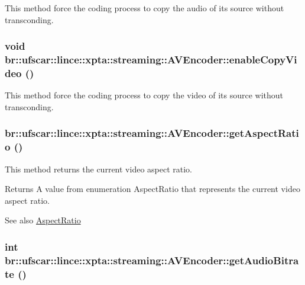 This method force the coding process to copy the audio of its source without transconding. 

\hypertarget{classbr_1_1ufscar_1_1lince_1_1xpta_1_1streaming_1_1AVEncoder_af0ad1de4c1aee3cef2f1700fb69ccfcf}{
\subsubsection[{enableCopyVideo}]{\setlength{\rightskip}{0pt plus 5cm}void br::ufscar::lince::xpta::streaming::AVEncoder::enableCopyVideo ()}}
\label{classbr_1_1ufscar_1_1lince_1_1xpta_1_1streaming_1_1AVEncoder_af0ad1de4c1aee3cef2f1700fb69ccfcf}


This method force the coding process to copy the video of its source without transconding. 

\hypertarget{classbr_1_1ufscar_1_1lince_1_1xpta_1_1streaming_1_1AVEncoder_a6cf4a940089410c06c126a13e57fe157}{
\subsubsection[{getAspectRatio}]{ br::ufscar::lince::xpta::streaming::AVEncoder::getAspectRatio ()}}
\label{classbr_1_1ufscar_1_1lince_1_1xpta_1_1streaming_1_1AVEncoder_a6cf4a940089410c06c126a13e57fe157}


This method returns the current video aspect ratio. 

\begin{DoxyReturn}{Returns}
A value from enumeration AspectRatio that represents the current video aspect ratio. 
\end{DoxyReturn}
\begin{DoxySeeAlso}{See also}
\hyperlink{namespacebr_1_1ufscar_1_1lince_1_1xpta_1_1streaming_a252e3034c41c058052743c39f2e66103}{AspectRatio} 
\end{DoxySeeAlso}
\hypertarget{classbr_1_1ufscar_1_1lince_1_1xpta_1_1streaming_1_1AVEncoder_a532d23d26f7f20dbb67f00131cbdafe9}{
\subsubsection[{getAudioBitrate}]{\setlength{\rightskip}{0pt plus 5cm}int br::ufscar::lince::xpta::streaming::AVEncoder::getAudioBitrate ()}}
\label{classbr_1_1ufscar_1_1lince_1_1xpta_1_1streaming_1_1AVEncoder_a532d23d26f7f20dbb67f00131cbdafe9}


